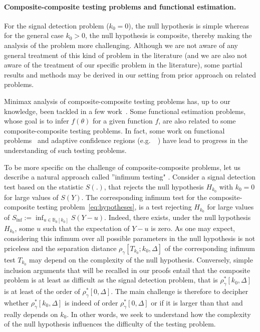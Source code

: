 \documentclass[twoside,11pt]{article}
\def\bbB{\mathbb{B}}
\newcommand{\<}{\langle}
\renewcommand{\>}{\rangle}
\begin{document}
\paragraph{Composite-composite testing problems and functional estimation.} For the signal detection problem ($k_0=0$), the null hypothesis is simple whereas for the general case $k_0>0$, the null hypothesis is composite, thereby making the analysis of the problem more challenging. Although we are not aware of any general treatment of this kind of problem in the literature (and we are also not aware of the treatment of our specific problem in the literature), some partial results and methods may be derived in our setting from prior approach on related problems. 

Minimax analysis of composite-composite testing problems has, up to our knowledge, been tackled in a few work~\cite{Juditsky_convexity,baraud2005testing,comminges2013minimax,carpentier2015testing}. Some functional estimation problems, whose goal is to infer $f(\theta)$ for a given function $f$, are also related to some composite-composite testing problems. In fact, some work on functional problems~\cite{lepski1999estimation, gayraud2005adaptive,cailow2011,MR2382653,MR2589318} and adaptive confidence regions (e.g.\ ~\cite{cai2004adaptation,cai2006adaptive, MR2906872,nickl_vandegeer}) have lead to progress in the understanding of such  testing problems. 


To be more specific on the challenge of composite-composite problems, let us describe a natural  approach  called ''infimum testing" \cite{gine2015mathematical}. Consider a signal detection test based on the statistic $S(.)$, that rejects the null hypothesis $H_{k_0}$ with $k_0=0$ for large values of $S(Y)$. The corresponding infimum test for the composite-composite testing problem~\eqref{eq:hypotheses}, is a test rejecting $H_{k_0}$ for large values of $S_{\inf}:=\inf_{u\in \bbB_0[k_0]}S(Y-u)$. Indeed, there exists, under the null hypothesis $H_{k_0}$, some $u$ such that the expectation of $Y-u$ is zero. As one may expect, considering this infimum over all possible parameters in the null hypothesis is not priceless and the separation distance $\rho_{\gamma}[T_{k_0};k_0,\Delta]$ of the corresponding infimum test $T_{k_0}$ may depend on the complexity of the null hypothesis. 
Conversely, simple inclusion arguments that will be recalled in our proofs entail that the composite problem is at least as difficult as the signal detection problem, that is $\rho^{*}_{\gamma}[k_0,\Delta]$ is at least of the  order of $\rho^{*}_{\gamma}[0,\Delta]$. The main challenge is therefore to decipher whether $\rho^{*}_{\gamma}[k_0,\Delta]$ is indeed of order $\rho^{*}_{\gamma}[0,\Delta]$ or if it is larger than that and really depends on $k_0$. In other words, we seek to understand how the complexity of the null hypothesis influences the difficulty of the testing problem. 
\end{document}
